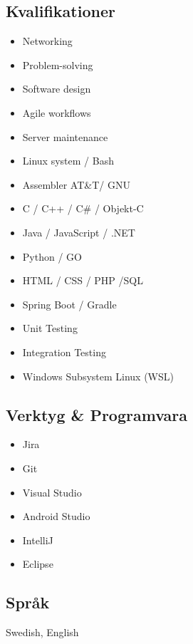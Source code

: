 \documentclass{article}
\begin{document}
\begin{minipage}[t]{0.28\textwidth}
		\subsection*{\textcolor{colorBlue}{Kvalifikationer}}
		\begin{itemize}
			\item Networking
			\item Problem-solving
			\item Software design
			\item Agile workflows
			\item Server maintenance
			\item Linux system / Bash
			\item Assembler AT\&T/ GNU
			\item C / C++ / C\# / Objekt-C
			\item Java / JavaScript / .NET
			\item Python / GO
			\item HTML / CSS / PHP /SQL
			\item Spring Boot / Gradle
			\item Unit Testing
			\item Integration Testing
			\item Windows Subsystem Linux (WSL)
		\end{itemize}
		\vspace{-10pt} %
		\subsection*{\textcolor{colorBlue}{Verktyg \& Programvara}}
		\begin{itemize}
			\item Jira
			\item Git
			\item Visual Studio
			\item Android Studio
			\item IntelliJ
			\item Eclipse
		\end{itemize}
		\vspace{-10pt} %
		\subsection*{\textcolor{colorBlue}{Språk}}
		Swedish, English
	\end{minipage}
	
\vspace{40pt} %
\end{document}
